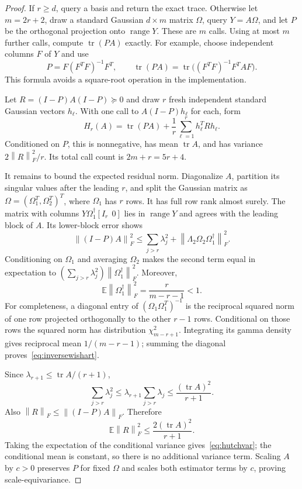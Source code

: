 \documentclass[11pt]{article}
\theoremstyle{definition}\newtheorem{definition}[theorem]{Definition}
\theoremstyle{remark}\newtheorem{remark}[theorem]{Remark}
\newcommand{\E}{\mathbb E}\newcommand{\PP}{\mathbb P}
\newcommand{\tr}{\operatorname{tr}}\newcommand{\rank}{\operatorname{rank}}
\newcommand{\range}{\operatorname{range}}\newcommand{\diag}{\operatorname{diag}}
\newcommand{\norm}[1]{\left\lVert#1\right\rVert}
\begin{document}
\begin{proof}
If $r\ge d$, query a basis and return the exact trace. Otherwise let
$m=2r+2$, draw a standard Gaussian $d\times m$ matrix $\Omega$, query
$Y=A\Omega$, and let $P$ be the orthogonal projection onto $\range Y$.
These are $m$ calls. Using at most $m$ further calls, compute $\tr(PA)$ exactly.
For example, choose independent columns $F$ of $Y$ and use
\[
 P=F(F^TF)^{-1}F^T,\qquad
 \tr(PA)=\tr\big((F^TF)^{-1}F^TAF\big).
\]
This formula avoids a square-root operation in the implementation.

Let $R=(I-P)A(I-P)\succeq0$ and draw $r$ fresh independent standard Gaussian
vectors $h_\ell$. With one call to $A(I-P)h_\ell$ for each, form
\[
 H_r(A)=\tr(PA)+\frac1r\sum_{\ell=1}^r h_\ell^T R h_\ell.
\]
Conditioned on $P$, this is nonnegative, has mean $\tr A$, and has variance
$2\norm R_F^2/r$. Its total call count is $2m+r=5r+4$.

It remains to bound the expected residual norm. Diagonalize $A$, partition its
singular values after the leading $r$, and split the Gaussian matrix as
$\Omega=(\Omega_1^T,\Omega_2^T)^T$, where $\Omega_1$ has $r$ rows.
It has full row rank almost surely. The matrix with columns
$Y\Omega_1^\dagger[I_r\ \ 0]$ lies in $\range Y$ and agrees with the leading
block of $A$. Its lower-block error shows
\[
 \norm{(I-P)A}_F^2
 \le \sum_{j>r}\lambda_j^2
        +\norm{\Lambda_2\Omega_2\Omega_1^\dagger}_F^2.
\]
Conditioning on $\Omega_1$ and averaging $\Omega_2$ makes the second term equal
in expectation to $(\sum_{j>r}\lambda_j^2)\norm{\Omega_1^\dagger}_F^2$.
Moreover,
\begin{equation}\label{eq:inversewishart}
 \E\norm{\Omega_1^\dagger}_F^2=\frac r{m-r-1}<1.
\end{equation}
For completeness, a diagonal entry of $(\Omega_1\Omega_1^T)^{-1}$ is the
reciprocal squared norm of one row projected orthogonally to the other $r-1$
rows. Conditional on those rows the squared norm has distribution
$\chi^2_{m-r+1}$. Integrating its gamma density gives reciprocal mean
$1/(m-r-1)$; summing the diagonal proves~\eqref{eq:inversewishart}.

Since $\lambda_{r+1}\le\tr A/(r+1)$,
\[
 \sum_{j>r}\lambda_j^2
 \le\lambda_{r+1}\sum_{j>r}\lambda_j
 \le\frac{(\tr A)^2}{r+1}.
\]
Also $\norm R_F\le\norm{(I-P)A}_F$. Therefore
\[
 \E\norm R_F^2\le\frac{2(\tr A)^2}{r+1}.
\]
Taking the expectation of the conditional variance gives~\eqref{eq:hutchvar};
the conditional mean is constant, so there is no additional variance term.
Scaling $A$ by $c>0$ preserves $P$ for fixed $\Omega$ and scales both estimator
terms by $c$, proving scale-equivariance.
\end{proof}
\end{document}
